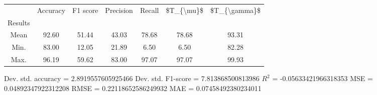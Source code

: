 \begin{tabular}{|c|c|c|c|c|c|c|}
\toprule
{} &  Accuracy &  F1 score &  Precision &  Recall &  \$T\_\{\textbackslash mu\}\$ &  \$T\_\{\textbackslash gamma\}\$ \\
Results &           &           &            &         &            &               \\
\hline
Mean    &     92.60 &     51.44 &      43.03 &   78.68 &      78.68 &         93.31 \\
Min.    &     83.00 &     12.05 &      21.89 &    6.50 &       6.50 &         82.28 \\
Max.    &     96.19 &     59.62 &      83.00 &   97.07 &      97.07 &         99.93 \\
\bottomrule
\end{tabular}

 Dev. std. accuracy = 2.8919557605925466
 Dev. std. F1-score = 7.813868500813986
 $R^2$ = -0.05633421966318353
 MSE = 0.04892347922312208
 RMSE = 0.22118652586249932
 MAE = 0.07458492380234011